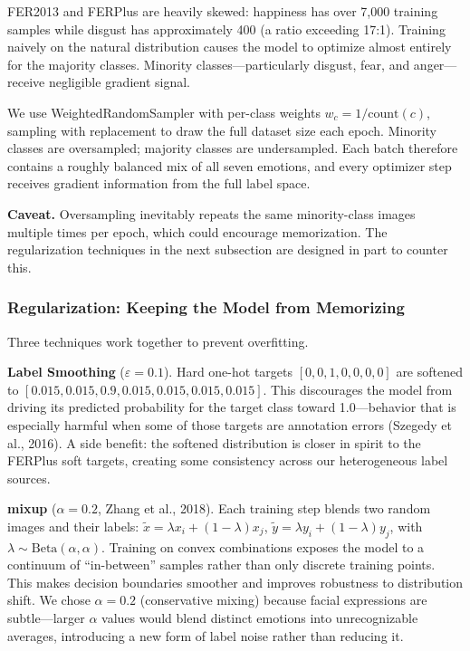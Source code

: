 \documentclass[12pt,a4paper]{article}
\begin{document}
FER2013 and FERPlus are heavily skewed: happiness has over 7,000 training samples while disgust has approximately 400 (a ratio exceeding 17:1). Training naively on the natural distribution causes the model to optimize almost entirely for the majority classes. Minority classes---particularly disgust, fear, and anger---receive negligible gradient signal.

We use WeightedRandomSampler with per-class weights $w_c = 1 / \text{count}(c)$, sampling with replacement to draw the full dataset size each epoch. Minority classes are oversampled; majority classes are undersampled. Each batch therefore contains a roughly balanced mix of all seven emotions, and every optimizer step receives gradient information from the full label space.

\textbf{Caveat.} Oversampling inevitably repeats the same minority-class images multiple times per epoch, which could encourage memorization. The regularization techniques in the next subsection are designed in part to counter this.

\subsubsection{Regularization: Keeping the Model from Memorizing}

Three techniques work together to prevent overfitting.

\textbf{Label Smoothing} ($\varepsilon=0.1$). Hard one-hot targets $[0,0,1,0,0,0,0]$ are softened to $[0.015,0.015,0.9,0.015,0.015,0.015,0.015]$. This discourages the model from driving its predicted probability for the target class toward 1.0---behavior that is especially harmful when some of those targets are annotation errors (Szegedy et al., 2016). A side benefit: the softened distribution is closer in spirit to the FERPlus soft targets, creating some consistency across our heterogeneous label sources.

\textbf{mixup} ($\alpha=0.2$, Zhang et al., 2018). Each training step blends two random images and their labels: $\tilde{x} = \lambda x_i + (1-\lambda) x_j$, $\tilde{y} = \lambda y_i + (1-\lambda) y_j$, with $\lambda \sim \text{Beta}(\alpha,\alpha)$. Training on convex combinations exposes the model to a continuum of ``in-between'' samples rather than only discrete training points. This makes decision boundaries smoother and improves robustness to distribution shift. We chose $\alpha=0.2$ (conservative mixing) because facial expressions are subtle---larger $\alpha$ values would blend distinct emotions into unrecognizable averages, introducing a new form of label noise rather than reducing it.
\end{document}
